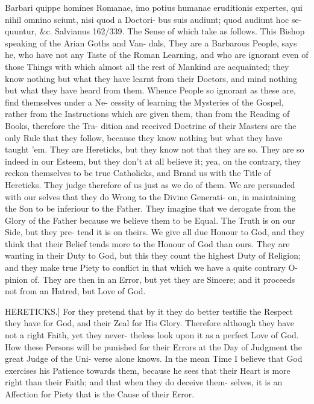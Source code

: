 Barbari quippe homines Romanae, imo
potius humanae eruditionis expertes, qui
nihil omnino sciunt, nisi quod a Doctori-
bus suis audiunt; quod audiunt hoc se-
quuntur, &c. Salvianus 162/339. The Sense
of which take as follows. This Bishop
speaking of the Arian Goths and Van-
dals, They are a Barbarous People,
says he, who have not any Taste of the
Roman Learning, and who are ignorant
even of those Things with which almost
all the rest of Mankind are acquainted;
they know nothing but what they have
learnt from their Doctors, and mind
nothing but what they have heard from
them. Whence People so ignorant as
these are, find themselves under a Ne-
cessity of learning the Mysteries of the
Gospel, rather from the Instructions
which are given them, than from the
Reading of Books, therefore the Tra-
dition and received Doctrine of their
Masters are the only Rule that they
follow, because they know nothing but
what they have taught 'em. They are
Hereticks, but they know not that they are
so. They are so indeed in our Esteem,
but they don't at all believe it; yea, on
the contrary, they reckon themselves to
be true Catholicks, and Brand us with
the Title of Hereticks. They judge
therefore of us just as we do of them.
We are persuaded with our selves that
they do Wrong to the Divine Generati-
on, in maintaining the Son to be inferiour
to the Father. They imagine that we
derogate from the Glory of the Father
because we believe them to be Equal.
The Truth is on our Side, but they pre-
tend it is on theirs. We give all due
Honour to God, and they think that
their Belief tends more to the Honour
of God than ours. They are wanting
in their Duty to God, but this they
count the highest Duty of Religion;
and they make true Piety to conflict in
that which we have a quite contrary O-
pinion of. They are then in an Error,
but yet they are Sincere; and it proceeds
not from an Hatred, but Love of God.

HERETICKS.] For they pretend that
by it they do better testifie the Respect
they have for God, and their Zeal for
His Glory. Therefore although they
have not a right Faith, yet they never-
theless look upon it as a perfect Love
of God. How these Persons will be
punished for their Errors at the Day of
Judgment the great Judge of the Uni-
verse alone knows. In the mean Time
I believe that God exercises his Patience
towards them, because he sees that their
Heart is more right than their Faith;
and that when they do deceive them-
selves, it is an Affection for Piety that
is the Cause of their Error.

